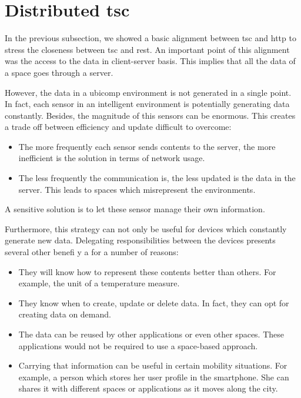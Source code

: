 \section{Distributed \ac{tsc}}

In the previous subsection, we showed a basic alignment between \ac{tsc} and \ac{http} to stress the closeness between \ac{tsc} and \ac{rest}.
An important point of this alignment was the access to the data in client-server basis.
This implies that all the data of a space goes through a server. %

However, the data in a \ac{ubicomp} environment is not generated in a single point.
In fact, each sensor in an intelligent environment is potentially generating data constantly.
Besides, the magnitude of this sensors can be enormous.
This creates a trade off between efficiency and update difficult to overcome:
\begin{itemize}
  \item The more frequently each sensor sends contents to the server, the more inefficient is the solution in terms of network usage.
  \item The less frequently the communication is, the less updated is the data in the server.
        This leads to spaces which misrepresent the environments.
\end{itemize}
A sensitive solution is to let these sensor manage their own information.

Furthermore, this strategy can not only be useful for devices which constantly generate new data.
Delegating responsibilities between the devices presents several other benefi y a for a number of reasons:
\begin{itemize}
  \item They will know how to represent these contents better than others. %
	For example, the unit of a temperature measure.
  \item They know when to create, update or delete data. %
        In fact, they can opt for creating data on demand.
  \item The data can be reused by other applications or even other spaces. %
        These applications would not be required to use a space-based approach.
  \item Carrying that information can be useful in certain mobility situations.
        For example, a person which stores her user profile in the smartphone.
        She can shares it with different spaces or applications as it moves along the city.
\end{itemize}


